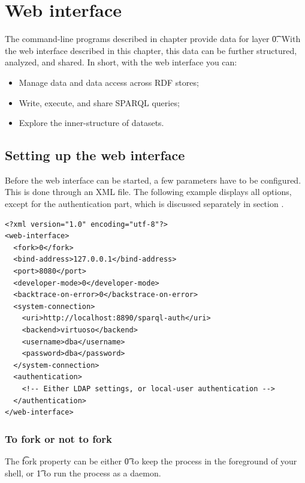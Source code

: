 \chapter{Web interface}
\label{chap:web-interface}

  The command-line programs described in chapter 
  provide data for layer \t{0}.  With the web interface described in
  this chapter, this data can be further structured, analyzed, and shared.
  In short, with the web interface you can:
  \begin{itemize}
  \item Manage data and data access across RDF stores;
  \item Write, execute, and share SPARQL queries;
  \item Explore the inner-structure of datasets.
  \end{itemize}

\section{Setting up the web interface}
\label{sec:configuring-sg-web}

  Before the web interface can be started, a few parameters have to be
  configured.  This is done through an XML file.  The following example
  displays all options, except for the authentication part, which is
  discussed separately in section .

\begin{siderules}
\begin{verbatim}
<?xml version="1.0" encoding="utf-8"?>
<web-interface>
  <fork>0</fork>
  <bind-address>127.0.0.1</bind-address>
  <port>8080</port>
  <developer-mode>0</developer-mode>
  <backtrace-on-error>0</backstrace-on-error>
  <system-connection>
    <uri>http://localhost:8890/sparql-auth</uri>
    <backend>virtuoso</backend>
    <username>dba</username>
    <password>dba</password>
  </system-connection>
  <authentication>
    <!-- Either LDAP settings, or local-user authentication -->
  </authentication>
</web-interface>
\end{verbatim}
\end{siderules}

\subsection{To fork or not to fork}

  The \t{fork} property can be either \t{0} to keep the
   process in the foreground of your shell, or
  \t{1} to run the  process as a daemon.

